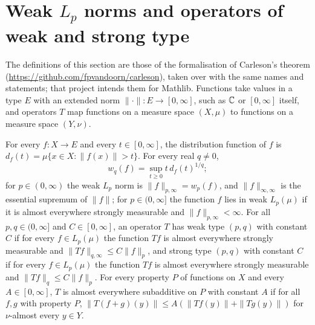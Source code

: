 \section{Weak \texorpdfstring{$L_p$}{L\_p} norms and operators of weak and strong type}
\label{sec:weak-type-operators}

The definitions of this section are those of the formalisation of Carleson's theorem
\cite{CarlesonLean} (\url{https://github.com/fpvandoorn/carleson}), taken over with the same
names and statements; that project intends them for Mathlib. Functions take values in a type
$E$ with an extended norm $\|\cdot\| : E \to [0, \infty]$, such as $\mathbb{C}$ or $[0, \infty]$
itself, and operators $T$ map functions on a measure space $(X, \mu)$ to functions on a measure
space $(Y, \nu)$.

\begin{definition}
\label{def:weak-type-operators}
\leanok
For every $f : X \to E$ and every $t \in [0, \infty]$, the distribution function of $f$ is
$d_f(t) = \mu\{x \in X : \|f(x)\| > t\}$. For every real $q \neq 0$,
\[
  w_q(f) = \sup_{t \geq 0} t \, d_f(t)^{1/q} ;
\]
for $p \in (0, \infty)$ the weak $L_p$ norm is $\|f\|_{p, \infty} = w_p(f)$, and
$\|f\|_{\infty, \infty}$ is the essential supremum of $\|f\|$; for $p \in (0, \infty]$ the
function $f$ lies in weak $L_p(\mu)$ if it is almost everywhere strongly measurable and
$\|f\|_{p, \infty} < \infty$. For all $p, q \in (0, \infty]$ and $C \in [0, \infty]$, an
operator $T$ has weak type $(p, q)$ with constant $C$ if for every $f \in L_p(\mu)$ the function
$T f$ is almost everywhere strongly measurable and $\|T f\|_{q, \infty} \leq C \|f\|_p$, and
strong type $(p, q)$ with constant $C$ if for every $f \in L_p(\mu)$ the function $T f$ is almost
everywhere strongly measurable and $\|T f\|_q \leq C \|f\|_p$. For every property $P$ of
functions on $X$ and every $A \in [0, \infty]$, $T$ is almost everywhere subadditive on $P$ with
constant $A$ if for all $f, g$ with property $P$,
$\|T(f + g)(y)\| \leq A (\|T f(y)\| + \|T g(y)\|)$ for $\nu$-almost every $y \in Y$.
\end{definition}

